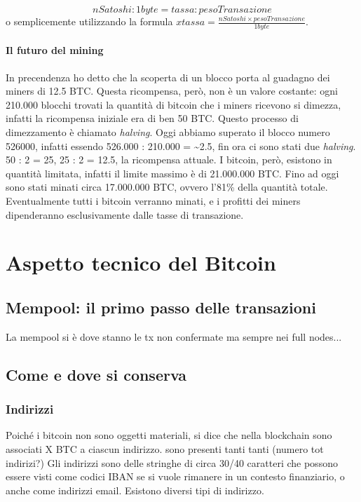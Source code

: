 \documentclass {article}
\begin{document}
$$ nSatoshi : 1 byte = tassa : pesoTransazione $$
%
o semplicemente utilizzando la formula $x tassa = \frac{nSatoshi \times pesoTransazione}{1 byte}$.

\paragraph {Il futuro del mining}

In precendenza ho detto che la scoperta di un blocco porta al guadagno dei miners di 12.5 BTC.
Questa ricompensa, però, non è un valore costante: ogni 210.000 blocchi trovati la quantità di bitcoin che i miners ricevono si dimezza, infatti la ricompensa iniziale era di ben 50 BTC. Questo processo di dimezzamento è chiamato \textit{halving}.
Oggi abbiamo superato il blocco numero 526000, infatti essendo 526.000 : 210.000 = \textasciitilde 2.5, fin ora ci sono stati due \textit{halving}.
50 : 2 = 25, 25 : 2 = 12.5, la ricompensa attuale.
I bitcoin, però, esistono in quantità limitata, infatti il limite massimo è di 21.000.000 BTC.
Fino ad oggi sono stati minati circa 17.000.000 BTC, ovvero l'81\% della quantità totale.
Eventualmente tutti i bitcoin verranno minati, e i profitti dei miners dipenderanno esclusivamente dalle tasse di transazione.


\newpage


\section {Aspetto tecnico del Bitcoin}


\subsection {Mempool: il primo passo delle transazioni}


La mempool si è dove stanno le tx non confermate ma sempre nei full nodes...


\subsection {Come e dove si conserva}


\subsubsection {Indirizzi}


Poiché i bitcoin non sono oggetti materiali, si dice che nella blockchain sono associati X BTC a ciascun indirizzo.
sono presenti tanti tanti (numero tot indirizi?)
Gli indirizzi sono delle stringhe di circa 30/40 caratteri che possono essere visti come codici IBAN se si vuole rimanere in un contesto finanziario, o anche come indirizzi email.
Esistono diversi tipi di indirizzo.
\end{document}
